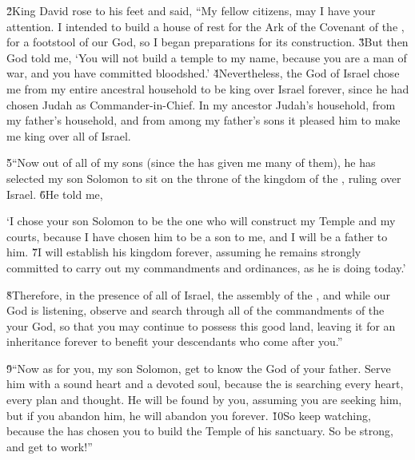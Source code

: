 \v{2}King David rose to his feet and said, ``My fellow citizens, may I have your attention. I intended to build a house of rest for the Ark of the Covenant of the , for a footstool of our God, so I began preparations for its construction. \v{3}But then God told me, `You will not build a temple to my name, because you are a man of war, and you have committed bloodshed.' \v{4}Nevertheless, the  God of Israel chose me from my entire ancestral household to be king over Israel forever, since he had chosen Judah as Commander-in-Chief. In my ancestor Judah's household, from my father's household, and from among my father's sons it pleased him to make me king over all of Israel.

\v{5}``Now out of all of my sons (since the  has given me many of them), he has selected my son Solomon to sit on the throne of the kingdom of the , ruling over Israel. \v{6}He told me,

\begin{poetry}
\poeml `I chose your son Solomon to be the one who will construct my Temple and my courts, because I have chosen him to be a son to me, and I will be a father to him. \v{7}I will establish his kingdom forever, assuming he remains strongly committed to carry out my commandments and ordinances, as he is doing today.'
\end{poetry}

\v{8}Therefore, in the presence of all of Israel, the assembly of the , and while our God is listening, observe and search through all of the commandments of the  your God, so that you may continue to possess this good land, leaving it for an inheritance forever to benefit your descendants who come after you.''

\v{9}``Now as for you, my son Solomon, get to know the God of your father. Serve him with a sound heart and a devoted soul, because the  is searching every heart, every plan and thought. He will be found by you, assuming you are seeking him, but if you abandon him, he will abandon you forever. \v{10}So keep watching, because the  has chosen you to build the Temple of his sanctuary. So be strong, and get to work!''

